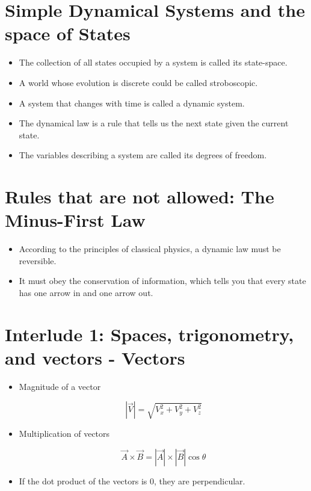 \documentclass[../main.tex]{subfiles}
\begin{document}
\section{Simple Dynamical Systems and the space of States}
\begin{itemize}
    \item The collection of all states occupied by a system is called its
        state-space. 

    \item A world whose evolution is discrete could be called stroboscopic.

    \item A system that changes with time is called a dynamic system.

    \item The dynamical law is a rule that tells us the next state given the
        current state.

    \item The variables describing a system are called its degrees of freedom.

\end{itemize}

\section{Rules that are not allowed: The Minus-First Law}
\begin{itemize}
    \item According to the principles of classical physics, a dynamic law must
        be reversible.

    \item It must obey the conservation of information, which tells you that
        every state has one arrow in and one arrow out.

\end{itemize}

\section{Interlude 1: Spaces, trigonometry, and vectors - Vectors}
\begin{itemize}
    \item Magnitude of a vector 

        \begin{equation}
            |\vec{V}| = \sqrt{V_{x}^2 + V_{y}^2 + V_{z}^2}  
        \end{equation}

    \item Multiplication of vectors

        \begin{equation}
            \vec{A}\times \vec{B} = |\vec{A}|\times |\vec{B}| \cos{\theta}
        \end{equation}

    \item If the dot product of the vectors is $0$, they are perpendicular.
\end{itemize}
\end{document}
